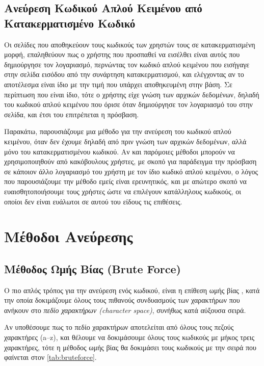 \documentclass[11pt]{article}
\begin{document}
\subsection{Ανεύρεση Κωδικού Απλού Κειμένου από Κατακερματισμένο Κωδικό}

Οι σελίδες που αποθηκεύουν τους κωδικούς των χρηστών τους σε κατακερματισμένη μορφή, επαληθεύουν πως ο χρήστης που προσπαθεί να εισέλθει είναι αυτός που δημιούργησε τον λογαριασμό, περνώντας τον κωδικό απλού κειμένου που εισήγαγε στην σελίδα εισόδου από την συνάρτηση κατακερματισμού, και ελέγχοντας αν το αποτέλεσμα είναι ίδιο με την τιμή που υπάρχει αποθηκευμένη στην βάση. Σε περίπτωση που είναι ίδιο, τότε ο χρήστης είχε γνώση των αρχικών δεδομένων, δηλαδή του κωδικού απλού κειμένου που όρισε όταν δημιούργησε τον λογαριασμό του στην σελίδα, και έτσι του επιτρέπεται η πρόσβαση.

Παρακάτω, παρουσιάζουμε μια μέθοδο για την ανεύρεση του κωδικού απλού κειμένου, όταν δεν έχουμε δηλαδή από πριν γνώση των αρχικών δεδομένων, αλλά μόνο του κατακερματισμένου κωδικού. Αν και παρόμοιες μέθοδοι μπορούν να χρησιμοποιηθούν από κακόβουλους χρήστες, με σκοπό για παράδειγμα την πρόσβαση σε κάποιον άλλο λογαριασμό του χρήστη με τον ίδιο κωδικό απλού κειμένου, ο λόγος που παρουσιάζουμε την μέθοδο εμείς είναι ερευνητικός, και με απώτερο σκοπό να ευαισθητοποιήσουμε τους χρήστες ώστε να επιλέγουν κατάλληλους κωδικούς, οι οποίοι δεν είναι ευάλωτοι σε αυτού του είδους τις επιθέσεις.

\section{Μέθοδοι Ανεύρεσης}

\subsection{Μέθοδος Ωμής Βίας (Brute Force)}

Ο πιο απλός τρόπος για την ανεύρεση ενός κωδικού, είναι η επίθεση ωμής βίας \cite{wiki:brute_force_attack}, κατά την οποία δοκιμάζουμε όλους τους πιθανούς συνδυασμούς των χαρακτήρων που ανήκουν στο \textit{πεδίο χαρακτήρων (character space)}, συνήθως κατά αύξουσα σειρά.

Αν υποθέσουμε πως το πεδίο χαρακτήρων αποτελείται από όλους τους πεζούς χαρακτήρες (a--z), και θέλουμε να δοκιμάσουμε όλους τους κωδικούς με μήκος τρεις χαρακτήρες, τότε η μέθοδος ωμής βίας θα δοκιμάσει τους κωδικούς με την σειρά που φαίνεται στον \autoref{tab:bruteforce}.
\end{document}
